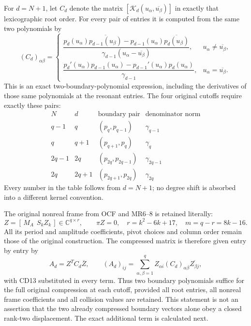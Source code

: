 \documentclass[11pt]{article}
\newcommand{\C}{\mathbb C}
\begin{document}
For \(d=N+1\), let \(C_d\) denote the matrix
\([\mathcal K_d(u_\alpha,\overline{u_\beta})]\) in exactly that
lexicographic root order. For every pair of entries it is computed from
the same two polynomials by
\begin{equation}\label{eq:entry-recipe}
 (C_d)_{\alpha\beta}=
 \begin{cases}
 \dfrac{p_d(u_\alpha)\overline{p_{d-1}(u_\beta)}-
 p_{d-1}(u_\alpha)\overline{p_d(u_\beta)}}
 {\gamma_{d-1}(u_\alpha-\overline{u_\beta})},
 &u_\alpha\ne\overline{u_\beta},\\[7pt]
 \dfrac{p_d'(u_\alpha)p_{d-1}(u_\alpha)-
 p_{d-1}'(u_\alpha)p_d(u_\alpha)}{\gamma_{d-1}},
 &u_\alpha=\overline{u_\beta}.
 \end{cases}
 \tag{CD13}
\end{equation}
This is an exact two-boundary-polynomial expression, including the
derivatives of those same polynomials at the resonant entries.
The four original cutoffs require exactly these pairs:
\[
\begin{array}{c|c|c|c}
N&d&\text{boundary pair}&\text{denominator norm}\\\hline
q-1&q&(p_q,p_{q-1})&\gamma_{q-1}\\
q&q+1&(p_{q+1},p_q)&\gamma_q\\
2q-1&2q&(p_{2q},p_{2q-1})&\gamma_{2q-1}\\
2q&2q+1&(p_{2q+1},p_{2q})&\gamma_{2q}
\end{array}
 \tag{CD14}
\]
Every number in the table follows from \(d=N+1\); no degree shift is
absorbed into a different kernel convention.

The original nonreal frame from OCF and MR6--8 is retained literally:
\[
 Z=[\,M_A\ \ S_kZ_k\,]\in\C^{q\times r},\qquad
 \pi Z=0,\quad r=k^2-6k+17,
 \quad m=q-r=8k-16.
\]
All its period and amplitude coefficients, pivot choices and column
order remain those of the original construction. The compressed matrix
is therefore given entry by entry by
\begin{equation}\label{eq:compression-recipe}
 A_d=Z^TC_d\overline Z,
 \qquad
 (A_d)_{ij}=\sum_{\alpha,\beta=1}^q
    Z_{\alpha i}(C_d)_{\alpha\beta}\overline{Z_{\beta j}},
 \tag{CD15}
\end{equation}
with CD13 substituted in every term. Thus two boundary polynomials
suffice for the full original compression at each cutoff, provided all
root entries, all nonreal frame coefficients and all collision values
are retained. This statement is not an assertion that the two already
compressed boundary vectors alone obey a closed rank-two displacement.
The exact additional term is calculated next.
\end{document}
